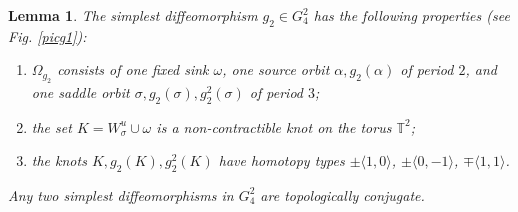 \documentclass{amsart}
\newtheorem{lemma}{Lemma}
\numberwithin{equation}{section}
\begin{document}
	\begin{lemma}\label{g10} The simplest diffeomorphism $g_{2}\in G_4^2$ has the following properties (see Fig. \ref{picg1}):
		\begin{enumerate}
			\item[1)] $\Omega_{g_{2}}$ consists of one fixed sink $\omega$, one source orbit $\alpha,g_{2}(\alpha)$ of period $2$, and one saddle orbit $\sigma,g_{2}(\sigma),g_{2}^2(\sigma)$ of period $3$;
			\item[2)] the set $K=W^u_\sigma\cup\omega$ is a non-contractible knot on the torus $\mathbb T^2$;
			\item[3)] the knots $K,g_{2}(K), g_{2}^2(K)$ have homotopy types $\pm\langle 1,0\rangle$, $\pm\langle 0,-1\rangle$, $\mp\langle 1,1\rangle$. 
		\end{enumerate}
		Any two simplest diffeomorphisms in $G_4^2$ are topologically conjugate.	
	\end{lemma}
\end{document}
